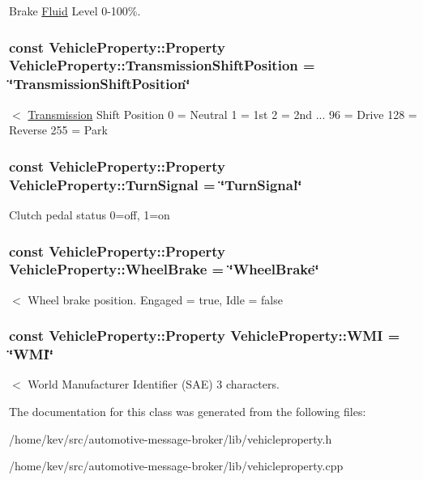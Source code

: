 Brake \hyperlink{interfaceFluid}{Fluid} Level 0-\/100\%. \hypertarget{classVehicleProperty_ae486d9ea26918460822086b797018800}{
\subsubsection[{Transmission\+Shift\+Position}]{\setlength{\rightskip}{0pt plus 5cm}const Vehicle\+Property\+::\+Property Vehicle\+Property\+::\+Transmission\+Shift\+Position = \char`\"{}Transmission\+Shift\+Position\char`\"{}\hspace{0.3cm}{\ttfamily [static]}}}\label{classVehicleProperty_ae486d9ea26918460822086b797018800}
$<$ \hyperlink{interfaceTransmission}{Transmission} Shift Position 0 = Neutral 1 = 1st 2 = 2nd ... 96 = Drive 128 = Reverse 255 = Park \hypertarget{classVehicleProperty_a0aae609c370a46a92dc52a31d2cc0310}{
\subsubsection[{Turn\+Signal}]{\setlength{\rightskip}{0pt plus 5cm}const Vehicle\+Property\+::\+Property Vehicle\+Property\+::\+Turn\+Signal = \char`\"{}Turn\+Signal\char`\"{}\hspace{0.3cm}{\ttfamily [static]}}}\label{classVehicleProperty_a0aae609c370a46a92dc52a31d2cc0310}
Clutch pedal status 0=off, 1=on \hypertarget{classVehicleProperty_ad4f1ec038bee5ef30fbf8308aaba2794}{
\subsubsection[{Wheel\+Brake}]{\setlength{\rightskip}{0pt plus 5cm}const Vehicle\+Property\+::\+Property Vehicle\+Property\+::\+Wheel\+Brake = \char`\"{}Wheel\+Brake\char`\"{}\hspace{0.3cm}{\ttfamily [static]}}}\label{classVehicleProperty_ad4f1ec038bee5ef30fbf8308aaba2794}
$<$ Wheel brake position. Engaged = true, Idle = false \hypertarget{classVehicleProperty_a32f980d900d97cf94171ea9fa25408e0}{
\subsubsection[{W\+M\+I}]{\setlength{\rightskip}{0pt plus 5cm}const Vehicle\+Property\+::\+Property Vehicle\+Property\+::\+W\+M\+I = \char`\"{}W\+M\+I\char`\"{}\hspace{0.3cm}{\ttfamily [static]}}}\label{classVehicleProperty_a32f980d900d97cf94171ea9fa25408e0}
$<$ World Manufacturer Identifier (S\+A\+E) 3 characters. 

The documentation for this class was generated from the following files\+:\begin{DoxyCompactItemize}
\item 
/home/kev/src/automotive-\/message-\/broker/lib/vehicleproperty.\+h\item 
/home/kev/src/automotive-\/message-\/broker/lib/vehicleproperty.\+cpp\end{DoxyCompactItemize}
